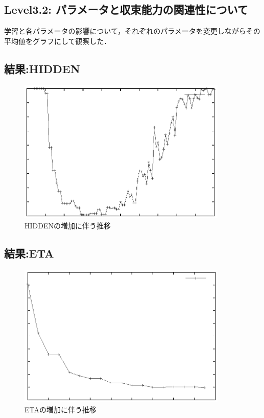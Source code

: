 \subsection{Level3.2: パラメータと収束能力の関連性について}
学習と各パラメータの影響について，それぞれのパラメータを変更しながらその平均値をグラフにして観察した．
\subsection{結果:HIDDEN}
\begin{figure}[h]
 \begin{center}
  \includegraphics[width=10.0cm]{level3/HIDDEN.eps}
  \caption{HIDDENの増加に伴う推移}
  \label{hidden}
 \end{center}
\end{figure} 

\subsection{結果:ETA}
\begin{figure}[h]
 \begin{center}
  \includegraphics[width=10.0cm]{level3/ETA.eps}
  \caption{ETAの増加に伴う推移}
  \label{eta}
 \end{center}
\end{figure} 
\newpage	
